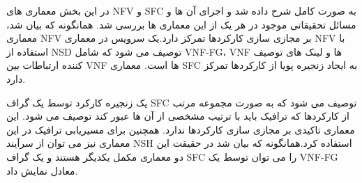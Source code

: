 
در این بخش معماری های NFV و SFC به صورت کامل شرح داده شد و اجزای آن ها و مسائل تحقیقاتی موجود در هر یک  از این معماری ها بررسی شد. همانگونه که بیان شد، معماری NFV بر مجازی سازی کارکردها تمرکز دارد.یک سرویس در معماری NFV با استفاده از NSD توصیف می شود که شامل VNF-FG، VNF ها و لینک های توصیف کننده ارتباطات بین VNF ها است. معماری SFC به ایجاد زنجیره پویا از کارکردها تمرکز دارد.

یک زنجیره کارکرد توسط یک گراف SFC توصیف می شود که به صورت مجموعه مرتب از کارکردها که ترافیک باید با ترتیب مشخصی از آن ها عبور کند توصیف می شود. این معماری تاکیدی بر مجازی سازی کارکردها ندارد. همچنین برای مسیریابی ترافیک در این معماری نیز می توان از سرآیند NSH استفاده کرد.همانگونه که بیان شد در حقیقت این دو معماری مکمل یکدیگر هستند و یک گراف SFC را می توان توسط یک VNF-FG معادل نمایش داد.
